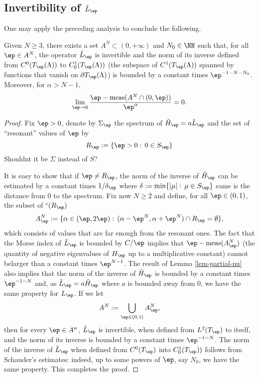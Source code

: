 \subsection{Invertibility of $\tilde L_\ep$}

One may apply the preceding analysis to conclude the following.

\begin{theorem}
Given $N\geq 3$, there exists a set $A^N\subset (0,+\infty)$ and $N_0\in \NN$
such that, for all $\ep\in A^N$, the operator $\tilde L_\ep$ is invertible and
the norm of its inverse defined from $C^0(T_\ep(\Lambda))$ to
$C_0^1(T_\ep(\Lambda))$ (the subspace of $C^1(T_\ep(\Lambda))$ spanned by
functions that vanish on $\partial T_\ep(\Lambda)$) is bounded by a constant
times $\ep^{-1-N-N_0}$. Moreover, for $\alpha>N-1$, 
$$
\lim_{\ep\to 0}\frac{\ep -\operatorname{meas}(A^N\cap(0,\ep))}{\ep^\alpha} = 0.
$$
\end{theorem}

\begin{proof}
 Fix $\ep>0$, denote by $\Sigma_\ep$ the spectrum of $\tilde H_\ep = a\tilde
 L_\ep$ and the set of ``resonant'' values of $\ep$ by
 $$
 R_\ep:=\{\ep>0:\, 0\in S_\ep\}
 $$
 {\color{red} Shouldnt it be $\Sigma$ instead of $S$?}

 It is easy to show that if $\ep\neq R_\ep$, the norm of the inverse of $\tilde
 H_\ep$ can be estimated by a constant times $1/\delta_\ep$ where
 $\delta:=\min\{|\mu|:\, \mu\in S_\ep\}$ {\color{red} same} is the distance
 from 0 to the spectrum.  Fix now $N\geq 2$ and define, for all $\ep\in(0,1)$,
 the subset of ${}^c(R_\ep)$
 \begin{equation}
    A_\ep^N:=\{\alpha\in(\ep,2\ep):\, (\alpha-\ep^N,\alpha + \ep^N)\cap
    R_\ep=\emptyset\},
\end{equation}
which consists of values that are far enough from the resonant ones. The fact
that the Morse index of $\tilde L_\ep$ is bounded by $C/\ep$ implies that
$\ep-\mbox{meas}(A_\ep^N)$ (the quantity of negative eigenvalues of $H_\ep$ up
to a multiplicative constant) cannot belarger than a constant times
$\ep^{N-1}$. The result of Lemma \ref{lem-partial-nu} also implies that the
norm of the inverse of $\tilde H_\ep$ is bounded by a constant times
$\ep^{-1-N}$ and, as $\tilde L_\ep = a\tilde H_\ep$ where $a$ is bounded away
from 0, we have the same property for $L_\ep$. If we let
\begin{equation}
    A^N:=\bigcup_{\ep\in(0,1)} A_\ep^N,
\end{equation}
then for every $\ep\in A^n$, $\tilde L_\ep$ is invertible, when defined from
$L^2(T_\ep)$ to itself, and the norm of its inverse is bounded by a constant
times $\ep^{-1-N}$. The norm of the inverse of $\tilde{L}_\ep$ when defined
from $C^0(T_\ep)$ into $C_0^1(T_\ep))$ follows from Schauder's estimates:
indeed, up to some powers of $\ep$, say $N_0$, we have the same property. This
completes the proof.
\end{proof}

